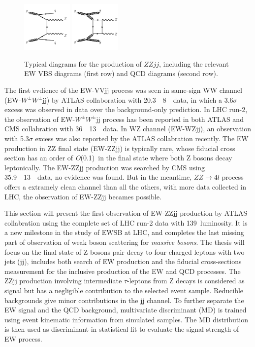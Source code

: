 \begin{figure}[!htbp]
\begin{center}
\includegraphics[width=0.22\textwidth]{figures/VBSZZ/diagram-QCDZZjj-gg.pdf}
\includegraphics[width=0.22\textwidth]{figures/VBSZZ/diagram-QCDZZjj-box.pdf}\\
\end{center}
\caption{Typical diagrams for the production of $ZZjj$, including the relevant EW VBS diagrams (first row) and QCD diagrams (second row).}
\label{fig:vbszz_diagrams}
\end{figure}

The first evdience of the EW-VVjj process was seen in same-sign WW channel (EW-$W^{\pm}W^{\pm}$jj) by ATLAS collaboration with 20.3~\ifb~8~\tev~data\cite{PhysRevLett.113.141803},
in which a 3.6$\sigma$ excess was observed in data over the background-only prediction.
In LHC run-2, the observation of EW-$W^{\pm}W^{\pm}$jj process has been reported in both ATLAS and CMS collabration with 36~\ifb~13~\tev~data\cite{PhysRevLett.123.161801, Sirunyan:2017ret}.
In WZ channel (EW-WZjj), an observation with 5.3$\sigma$ excess was also reported by the ATLAS collabration recently\cite{2019469}.
The EW production in ZZ final state (EW-ZZjj) is typically rare, whose fiducial cross section has an order of \textit{O}(0.1)~\ifb in the final state where both Z bosons decay leptonically.
The EW-ZZjj production was searched by CMS using 35.9~\ifb~13~\tev~data, no evidence was found\cite{2017682}.
But in the meantime, $ZZ \rightarrow 4l$ process offers a extramely clean channel than all the others, with more data collected in LHC, the observation of EW-ZZjj becames possible.

This section will present the first observation of EW-ZZjj production by ATLAS collabration using the complete set of LHC run-2 data with 139~\ifb luminosity.
It is a new milestone in the study of EWSB at LHC, and completes the last missing part of observation of weak boson scattering for \textit{massive bosons}.
The thesis will focus on the final state of Z bosons pair decay to four charged leptons with two jets (\llll jj), includes both search of EW production and the fiducial cross-sections measurement for the inclusive production of the EW and QCD processes.
The ZZjj production involving intermediate $\tau$-leptons from Z decays is considered as signal but has a negligible contribution to the selected event sample.
Reducible backgrounds give minor contributions in the \llll jj channel.
To further separate the EW signal and the QCD background, multivariate discriminant (MD) is trained using event kinematic information from simulated samples. 
The MD distribution is then used as discriminant in statistical fit to evaluate the signal strength of EW process.
